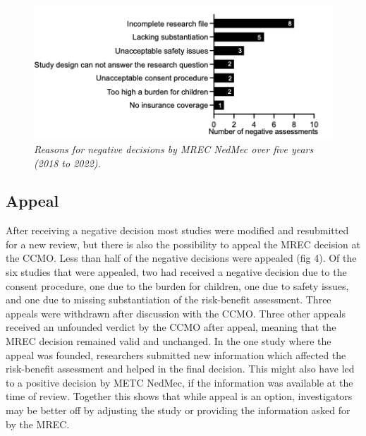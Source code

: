 \documentclass[authordate, meta]{jote-new-article}
\begin{document}
\begin{figure}
  \begin{fullwidth}
    \includegraphics[width=\linewidth]{media/Picture3.png}

    \caption{\emph{Reasons for negative decisions by MREC NedMec over five years (2018 to 2022).}}

    \label{fig:rId13}

  \end{fullwidth}
\end{figure}


\subsection{Appeal}



After receiving a negative decision most studies were modified and resubmitted for a new review, but there is also the possibility to appeal the MREC decision at the CCMO. Less than half of the negative decisions were appealed (fig 4). Of the six studies that were appealed, two had received a negative decision due to the consent procedure, one due to the burden for children, one due to safety issues, and one due to missing substantiation of the risk-benefit assessment. Three appeals were withdrawn after discussion with the CCMO. Three other appeals received an unfounded verdict by the CCMO after appeal, meaning that the MREC decision remained valid and unchanged. In the one study where the appeal was founded, researchers submitted new information which affected the risk-benefit assessment and helped in the final decision. This might also have led to a positive decision by METC NedMec, if the information was available at the time of review. Together this shows that while appeal is an option, investigators may be better off by adjusting the study or providing the information asked for by the MREC.
\end{document}
